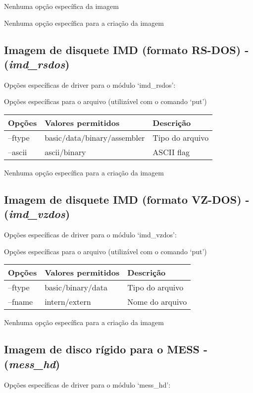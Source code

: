 \documentclass[letterpaper,10pt,brazil]{sphinxmanual}
\begin{document}
Nenhuma opção específica da imagem

Nenhuma opção específica para a criação da imagem


\subsection{Imagem de disquete IMD (formato RS-DOS) - (\emph{imd\_rsdos})}
\label{tools/imgtool:imagem-de-disquete-imd-formato-rs-dos-imd-rsdos}
Opções específicas de driver para o módulo `imd\_rsdos':

Opções específicas para o arquivo (utilizável com o comando `put')

\noindent\begin{tabulary}{\linewidth}{|L|L|L|}
\hline

Opções
&
Valores permitidos
&
Descrição
\\
\hline
--ftype
&
basic/data/binary/assembler
&
Tipo do arquivo
\\
\hline
--ascii
&
ascii/binary
&
ASCII flag
\\
\hline\end{tabulary}


Nenhuma opção específica para a criação da imagem


\subsection{Imagem de disquete IMD (formato VZ-DOS) - (\emph{imd\_vzdos})}
\label{tools/imgtool:imagem-de-disquete-imd-formato-vz-dos-imd-vzdos}
Opções específicas de driver para o módulo `imd\_vzdos':

Opções específicas para o arquivo (utilizável com o comando `put')

\noindent\begin{tabulary}{\linewidth}{|L|L|L|}
\hline

Opções
&
Valores permitidos
&
Descrição
\\
\hline
--ftype
&
basic/binary/data
&
Tipo do arquivo
\\
\hline
--fname
&
intern/extern
&
Nome do arquivo
\\
\hline\end{tabulary}


Nenhuma opção específica para a criação da imagem


\subsection{Imagem de disco rígido para o  MESS - (\emph{mess\_hd})}
\label{tools/imgtool:imagem-de-disco-rigido-para-o-mess-mess-hd}
Opções específicas de driver para o módulo `mess\_hd':
\end{document}
